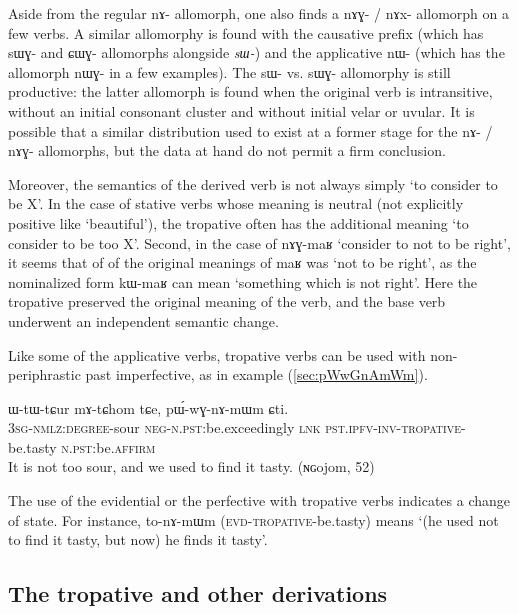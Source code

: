 \documentclass[oldfontcommands,twoside,a4paper,12pt]{article}
\newcommand{\ipa}[1]{{\phon \mbox{#1}}} %
\begin{document}
Aside from the regular \ipa{nɤ-} allomorph, one also finds a \ipa{nɤɣ-} / \ipa{nɤx-} allomorph on a few verbs. A similar allomorphy is found with the causative prefix (which has \ipa{sɯɣ-} and \ipa{ɕɯɣ-} allomorphs alongside \textit{sɯ-}) and the applicative \ipa{nɯ-} (which has the allomorph \ipa{nɯɣ-} in a few examples). The  \ipa{sɯ-} vs. \ipa{sɯɣ-} allomorphy is still productive: the latter allomorph is found when the original verb is intransitive, without an initial consonant cluster and without initial velar or uvular. It is possible that a similar distribution used to exist  at a former stage for the \ipa{nɤ-} / \ipa{nɤɣ-} allomorphs, but the data at hand do not permit a firm conclusion.

Moreover, the semantics of the derived verb is not always simply `to consider to be X'. In the case of stative verbs whose meaning is neutral (not explicitly positive like `beautiful'), the tropative often has the additional meaning `to consider to be too X'. Second, in the case of \ipa{nɤɣ-maʁ} `consider to not to be right', it seems that of of the original meanings of   \ipa{maʁ}  was `not to be right', as the nominalized form \ipa{kɯ-maʁ} can mean `something which is not right'. Here the tropative preserved the original meaning of the verb, and the base verb underwent an independent semantic change.

Like some of the applicative verbs,  tropative verbs can be used with non-periphrastic past imperfective, as in example (\ref{sec:pWwGnAmWm}).

 \begin{exe}
\ex \label{sec:pWwGnAmWm}
\gll
 \ipa{ɯ-tɯ-tɕur}  	\ipa{mɤ-tɕhom}  	\ipa{tɕe,}  	\ipa{pɯ́-wɣ-nɤ-mɯm}  	\ipa{ɕti.}  \\
\textsc{3sg-nmlz:degree}-sour \textsc{neg-n.pst}:be.exceedingly \textsc{lnk} \textsc{pst.ipfv-inv-tropative}-be.tasty \textsc{n.pst}:be.\textsc{affirm} \\
 \glt It is not too sour, and we used to find it tasty. (ɴɢojom, 52)
\end{exe}  

The use of the evidential or the perfective with tropative verbs indicates a change of state. For instance, \ipa{to-nɤ-mɯm} (\textsc{evd-tropative}-be.tasty) means `(he used not to find it tasty, but now) he finds it tasty'.

\subsection{The tropative and other derivations}
\end{document}
